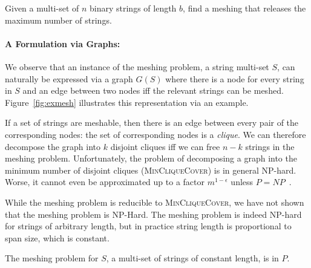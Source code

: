 \begin{problem}
Given a multi-set of $n$ binary strings of length $b$, find a meshing
that releases the maximum number of strings.
\end{problem}


\paragraph{A Formulation via Graphs:}
\label{subsec:graph}

We observe that an instance of the meshing problem, a string multi-set
$S$, can naturally be expressed via a graph $G(S)$ where there is a
node for every string in $S$ and an edge between two nodes iff the
relevant strings can be meshed. Figure~\ref{fig:exmesh} illustrates
this representation via an example.



If a set of strings are meshable, then there is an edge between every
pair of the corresponding nodes: the set of corresponding nodes is a
\emph{clique}. We can therefore decompose the graph into $k$ disjoint
cliques iff we can free $n-k$ strings in the meshing
problem. Unfortunately, the problem of decomposing a graph into the
minimum number of disjoint cliques (\textsc{MinCliqueCover}) is in
general NP-hard. Worse, it cannot even be approximated up to a factor
$m^{1-\epsilon}$ unless $P=NP$~\cite{zuckerman07}.

While the meshing problem is reducible to {\textsc{MinCliqueCover}},
we have not shown that the meshing problem is NP-Hard.  The meshing
problem is indeed NP-hard for strings of arbitrary length, but in
practice string length is proportional to span size, which is
constant.

\begin{theorem}\label{thm:polytime}
The meshing problem for $S$, a multi-set of strings of constant length, is in $P$. %
\end{theorem}

